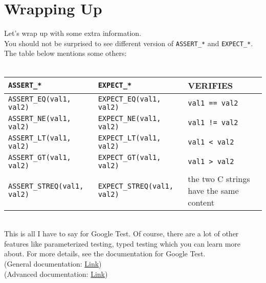 \section{Wrapping Up}

Let's wrap up with some extra information. \\

You should not be surprised to see different version of
\verb!ASSERT_*! and \verb!EXPECT_*!. The table below mentions some others: \\ \\
\begin{tabular}{| p{5.5cm} | p{5.5cm} | p{6cm} |}
\hline
\verb!ASSERT_*! & \verb!EXPECT_*! & VERIFIES \\
\hline \hline
\verb!ASSERT_EQ(val1, val2)! & \verb!EXPECT_EQ(val1, val2)! & \verb!val1 == val2! \\ 
\hline
\verb!ASSERT_NE(val1, val2)! & \verb!EXPECT_NE(val1, val2)! & \texttt{val1 != val2} \\
\hline
\verb!ASSERT_LT(val1, val2)! & \verb!EXPECT_LT(val1, val2)! & \verb!val1 < val2! \\
\hline
\verb!ASSERT_GT(val1, val2)! & \verb!EXPECT_GT(val1, val2)! & \verb!val1 > val2! \\
\hline
\verb!ASSERT_STREQ(val1, val2)! & \verb!EXPECT_STREQ(val1, val2)! & the two C strings have the same content \\
\hline
\end{tabular}
\\

This is all I have to say for Google Test. Of course, there are a lot
of other features like parameterized testing, typed testing which you
can learn more about. For more details, see the documentation for
Google Test. \\
(General documentation: \href{https://github.com/google/googletest/blob/master/googletest/docs/primer.md}{Link}) \\
(Advanced documentation: \href{https://github.com/google/googletest/blob/master/googletest/docs/advanced.md}{Link})


\newpage
